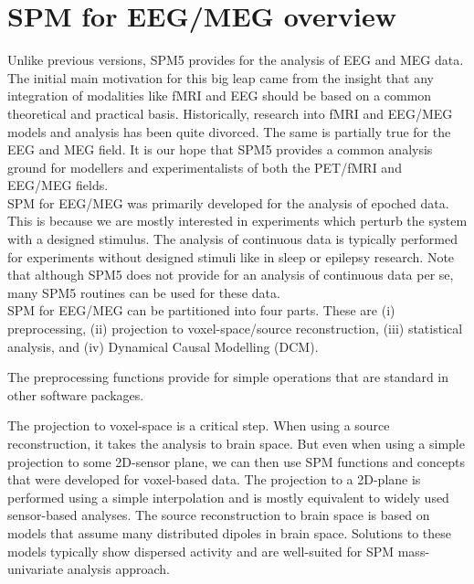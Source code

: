\chapter{SPM for EEG/MEG overview \label{Chap:eeg:overview}}

Unlike previous versions, SPM5 provides for
the analysis of EEG and MEG data. The initial main motivation for this big
leap came from the insight that any integration of modalities like
fMRI and EEG should be based on a common theoretical and practical
basis. Historically, research into fMRI and EEG/MEG models and
analysis has been quite divorced. The same is partially true for the
EEG and MEG field. It is our hope that SPM5 provides a common analysis
ground for modellers and experimentalists of both the PET/fMRI and 
EEG/MEG fields.
\\

SPM for EEG/MEG was primarily developed for the analysis of epoched
data. This is because we are mostly interested in experiments which
perturb the system with a designed stimulus. The analysis of
continuous data is typically performed for experiments without
designed stimuli like in sleep or epilepsy research. Note that although
SPM5 does not provide for an analysis of continuous data per se, many
SPM5 routines can be used for these data.
\\

SPM for EEG/MEG can be partitioned into four parts. These are (i)
preprocessing, (ii) projection to voxel-space/source reconstruction,
(iii) statistical analysis, and (iv) Dynamical Causal Modelling (DCM). 

The preprocessing functions provide for simple operations that are
standard in other software packages. 

The projection to voxel-space is a critical step. When using a source
reconstruction, it takes the analysis to brain space. But even when
using a simple projection to some 2D-sensor plane, we can then use SPM
functions and concepts that were developed for voxel-based data. The
projection to a 2D-plane is performed using a simple interpolation and
is mostly equivalent to widely used sensor-based analyses. The source
reconstruction to brain space is based on models that assume many
distributed dipoles in brain space. Solutions to these models
typically show dispersed activity and are well-suited for SPM
mass-univariate analysis approach.
\\

